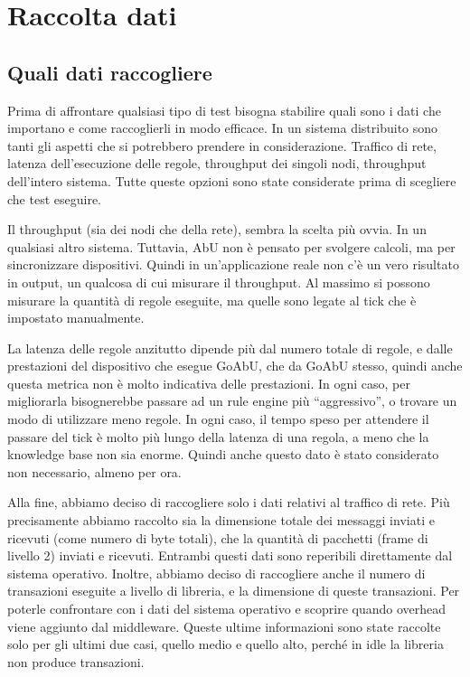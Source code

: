 \documentclass[12pt, a4paper]{article}
\begin{document}
\section{Raccolta dati}

\subsection{Quali dati raccogliere}\label{raccolta:quali}

Prima di affrontare qualsiasi tipo di test bisogna stabilire quali sono i dati che importano e come raccoglierli in modo efficace.
In un sistema distribuito sono tanti gli aspetti che si potrebbero prendere in considerazione. Traffico di rete, latenza dell'esecuzione delle regole, throughput dei singoli nodi, throughput dell'intero sistema. Tutte queste opzioni sono state considerate prima di scegliere che test eseguire.

Il throughput (sia dei nodi che della rete), sembra la scelta più ovvia. In un qualsiasi altro sistema. Tuttavia, AbU non è pensato per svolgere calcoli, ma per sincronizzare dispositivi.
Quindi in un'applicazione reale non c'è un vero risultato in output, un qualcosa di cui misurare il throughput. Al massimo si possono misurare la quantità di regole eseguite, ma quelle sono legate al tick che è impostato manualmente.

La latenza delle regole anzitutto dipende più dal numero totale di regole, e dalle prestazioni del dispositivo che esegue GoAbU, che da GoAbU stesso, quindi anche questa metrica non è molto indicativa delle prestazioni.
In ogni caso, per migliorarla bisognerebbe passare ad un rule engine più ``aggressivo'', o trovare un modo di utilizzare meno regole.
In ogni caso, il tempo speso per attendere il passare del tick è molto più lungo della latenza di una regola, a meno che la knowledge base non sia enorme.
Quindi anche questo dato è stato considerato non necessario, almeno per ora.

Alla fine, abbiamo deciso di raccogliere solo i dati relativi al traffico di rete. Più precisamente abbiamo raccolto sia la dimensione totale dei messaggi inviati e ricevuti (come numero di byte totali), che la quantità di pacchetti (frame di livello 2) inviati e ricevuti. Entrambi questi dati sono reperibili direttamente dal sistema operativo.
Inoltre, abbiamo deciso di raccogliere anche il numero di transazioni eseguite a livello di libreria, e la dimensione di queste transazioni. Per poterle confrontare con i dati del sistema operativo e scoprire quando overhead viene aggiunto dal middleware.
Queste ultime informazioni sono state raccolte solo per gli ultimi due casi, quello medio e quello alto, perché in idle la libreria non produce transazioni.
\end{document}
